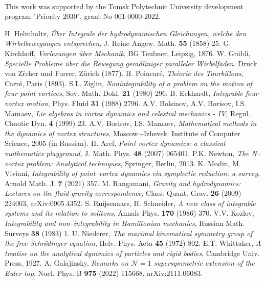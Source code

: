\documentclass[12pt]{article}
\begin{document}
\\

\noindent
This work was supported by the Tomsk Polytechnic University development program "Priority 2030", grant No 001-0000-2022.


\begin{thebibliography}{nn}
H. Helmholtz, {\it \"Uber Integrale der hydrodynamischen Gleichungen, welche den Wirbelbewegungen entsprechen}, J.
Reine Angew. Math. {\bf 55} (1858) 25.
G. Kirchhoff, {\it Vorlesungen \"uber Mechanik}, BG Teubner, Leipzig, 1876.
W. Gr\"obli, {\it Specielle Probleme \"uber die Bewegung geradliniger paralleler Wirbelf\"aden}. Druck von
Z\"rcher und Furrer, Z\"urich (1877).
H. Poincar\'e, {\it Th\'eorie des Tourbillons}, Carr\'e, Paris (1893).
S.L. Ziglin, {\it Nonintegrability of a problem on the motion of four point vortices}, Sov.
Math. Dokl. {\bf 21} (1980) 296.
B. Eckhardt, {\it Integrable four vortex motion}, Phys. Fluid {\bf 31} (1988) 2796.
A.V. Bolsinov, A.V. Borisov, I.S. Mamaev, {\it Lie algebras in vortex dynamics and celestial mechanics
- IV},  Regul. Chaotic Dyn. {\bf 4} (1999)  23.
A.V. Borisov, I.S. Mamaev, {\it  Mathematical methods in the dynamics of vortex structures},
Moscow–-Izhevsk: Institute of Computer Science, 2005 (in Russian).
H. Aref, {\it Point vortex dynamics: a classical mathematics playground}, J. Math. Phys. {\bf 48} (2007) 065401.
P.K. Newton, {\it The N--vortex problem: Analytical techniques}, Springer, Berlin, 2013.
K. Modin, M. Viviani, {\it Integrability of point--vortex dynamics via symplectic
reduction: a survey}, Arnold Math. J. {\bf 7} (2021) 357.
M. Rangamani, {\it Gravity and hydrodynamics: Lectures on the fluid-gravity correspondence}, Class. Quant. Grav. {\bf 26} (2009) 224003, arXiv:0905.4352.
S. Ruijsenaars, H. Schneider, {\it A new class of integrable systems and
its relation to solitons}, Annals Phys. {\bf 170} (1986) 370.
V.V. Kozlov, {\it Integrability and non--integrability in Hamiltonian mechanics}, Russian Math. Surveys {\bf 38} (1983) 1.
U. Niederer, {\it The maximal kinematical symmetry group
of the free Schr\"odinger equation}, Helv. Phys. Acta {\bf 45} (1972) 802.
 E.T. Whittaker, {\it A treatise on the analytical dynamics of particles and rigid bodies}, Cambridge Univ. Press, 1927.
A. Galajinsky, {\it Remarks on $\mathcal{N}=1$ supersymmetric extension of the Euler top}, Nucl. Phys. B {\bf 975} (2022) 115668, arXiv:2111.06083.
\end{thebibliography}
\end{document}
